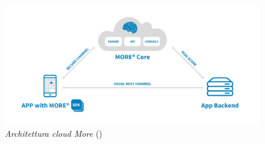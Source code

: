 \begin{figure}[h!]
	\centering
	\includegraphics[scale=0.15]{immagini/more-arc.png}
	\caption{\textit{Architettura cloud More\textregistered} ()}
\end{figure}
\newpage

